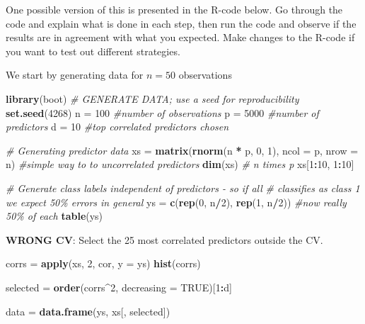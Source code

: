 \documentclass[
]{article}
\newenvironment{Shaded}{\begin{snugshade}}{\end{snugshade}}
\newcommand{\AttributeTok}[1]{\textcolor[rgb]{0.13,0.29,0.53}{#1}}
\newcommand{\CommentTok}[1]{\textcolor[rgb]{0.56,0.35,0.01}{\textit{#1}}}
\newcommand{\ConstantTok}[1]{\textcolor[rgb]{0.56,0.35,0.01}{#1}}
\newcommand{\DecValTok}[1]{\textcolor[rgb]{0.00,0.00,0.81}{#1}}
\newcommand{\FunctionTok}[1]{\textcolor[rgb]{0.13,0.29,0.53}{\textbf{#1}}}
\newcommand{\NormalTok}[1]{#1}
\newcommand{\OtherTok}[1]{\textcolor[rgb]{0.56,0.35,0.01}{#1}}
\newcommand{\SpecialCharTok}[1]{\textcolor[rgb]{0.81,0.36,0.00}{\textbf{#1}}}
\begin{document}
One possible version of this is presented in the R-code below. Go
through the code and explain what is done in each step, then run the
code and observe if the results are in agreement with what you expected.
Make changes to the R-code if you want to test out different strategies.

We start by generating data for \(n=50\) observations

\begin{Shaded}
\begin{Highlighting}[]
\FunctionTok{library}\NormalTok{(boot)}
\CommentTok{\# GENERATE DATA; use a seed for reproducibility}
\FunctionTok{set.seed}\NormalTok{(}\DecValTok{4268}\NormalTok{)}
\NormalTok{n }\OtherTok{=} \DecValTok{100}  \CommentTok{\#number of observations}
\NormalTok{p }\OtherTok{=} \DecValTok{5000}  \CommentTok{\#number of predictors}
\NormalTok{d }\OtherTok{=} \DecValTok{10}  \CommentTok{\#top correlated predictors chosen}

\CommentTok{\# Generating predictor data}
\NormalTok{xs }\OtherTok{=} \FunctionTok{matrix}\NormalTok{(}\FunctionTok{rnorm}\NormalTok{(n }\SpecialCharTok{*}\NormalTok{ p, }\DecValTok{0}\NormalTok{, }\DecValTok{1}\NormalTok{), }\AttributeTok{ncol =}\NormalTok{ p, }\AttributeTok{nrow =}\NormalTok{ n)  }\CommentTok{\#simple way to to uncorrelated predictors}
\FunctionTok{dim}\NormalTok{(xs)  }\CommentTok{\# n times p}
\NormalTok{xs[}\DecValTok{1}\SpecialCharTok{:}\DecValTok{10}\NormalTok{, }\DecValTok{1}\SpecialCharTok{:}\DecValTok{10}\NormalTok{]}

\CommentTok{\# Generate class labels independent of predictors {-} so if all}
\CommentTok{\# classifies as class 1 we expect 50\% errors in general}
\NormalTok{ys }\OtherTok{=} \FunctionTok{c}\NormalTok{(}\FunctionTok{rep}\NormalTok{(}\DecValTok{0}\NormalTok{, n}\SpecialCharTok{/}\DecValTok{2}\NormalTok{), }\FunctionTok{rep}\NormalTok{(}\DecValTok{1}\NormalTok{, n}\SpecialCharTok{/}\DecValTok{2}\NormalTok{))  }\CommentTok{\#now really 50\% of each}
\FunctionTok{table}\NormalTok{(ys)}
\end{Highlighting}
\end{Shaded}

\textbf{WRONG CV}: Select the 25 most correlated predictors outside the
CV.

\begin{Shaded}
\begin{Highlighting}[]
\NormalTok{corrs }\OtherTok{=} \FunctionTok{apply}\NormalTok{(xs, }\DecValTok{2}\NormalTok{, cor, }\AttributeTok{y =}\NormalTok{ ys)}
\FunctionTok{hist}\NormalTok{(corrs)}


\NormalTok{selected }\OtherTok{=} \FunctionTok{order}\NormalTok{(corrs}\SpecialCharTok{\^{}}\DecValTok{2}\NormalTok{, }\AttributeTok{decreasing =} \ConstantTok{TRUE}\NormalTok{)[}\DecValTok{1}\SpecialCharTok{:}\NormalTok{d]}

\NormalTok{data }\OtherTok{=} \FunctionTok{data.frame}\NormalTok{(ys, xs[, selected])}
\end{Highlighting}
\end{Shaded}
\end{document}
